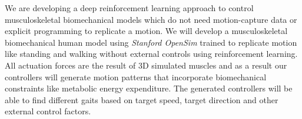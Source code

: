 
We are developing a deep reinforcement learning approach to control
musculoskeletal biomechanical models which do not need motion-capture data or
explicit programming to replicate a motion. We will develop a
musculoskeletal biomechanical human model using \emph{Stanford OpenSim}
trained to replicate motion like standing and walking without external
controls using reinforcement learning. All actuation forces are the result
of 3D simulated muscles and as a result our controllers will generate motion
patterns that incorporate biomechanical constraints like metabolic energy
expenditure. The generated controllers will be able to find different gaits
based on target speed, target direction and other external control factors.